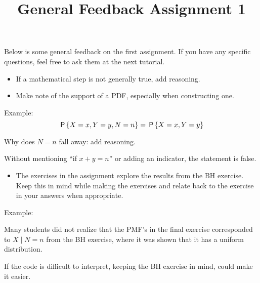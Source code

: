 


\title{General Feedback Assignment 1}


\maketitle

Below is some general feedback on the first assignment. If you have
any specific questions, feel free to ask them at the next tutorial.

\begin{itemize}
\item If a mathematical step is not generally true, add reasoning.
\item Make note of the support of a PDF, especially when constructing one.
\end{itemize}

Example:
$$\P{X=x, Y=y, N=n} = \P{X=x, Y=y}$$

Why does $N=n$ fall away: add reasoning.

Without mentioning ``if $x+y=n$'' or adding an indicator, the
statement is false.

\begin{itemize}
\item The exercises in the assignment explore the results from the BH
exercise. Keep this in mind while making the exercises and relate
back to the exercise in your answers when appropriate.
\end{itemize}

Example:

Many students did not realize that the PMF's in the final exercise
corresponded to $X\mid N=n$ from the BH exercise, where it was shown
that it has a uniform distribution.

If the code is difficult to interpret, keeping the BH exercise in
mind, could make it easier.


